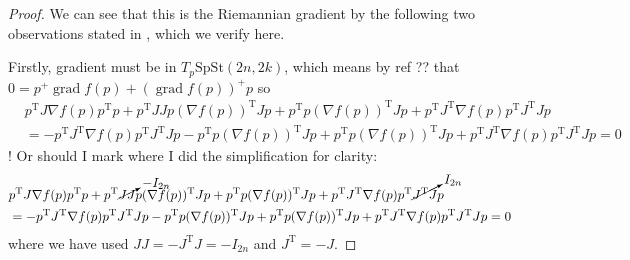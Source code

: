 \begin{proof}
    We can see that this is the Riemannian gradient by the following two observations stated in \cite{BZ}, which we verify here.

    Firstly, gradient must be in $T_{p}\mathrm{SpSt}(2n, 2k)$, which means by ref ?? that $0=p^{+}\operatorname{grad}f(p)+(\operatorname{grad}f(p))^{+}p$ so 
    \begin{align}
    &p^{\mathrm{T}}J\nabla f(p)p^{\mathrm{T}}p+p^{\mathrm{T}}JJp(\nabla f(p))^{\mathrm{T}}Jp+p^{\mathrm{T}}p(\nabla f(p))^{\mathrm{T}}Jp+p^{\mathrm{T}}J^{\mathrm{T}}\nabla f(p)p^{\mathrm{T}}J^{\mathrm{T}}Jp\\
    &= -p^{\mathrm{T}}J^{\mathrm{T}}\nabla f(p)p^{\mathrm{T}}J^{\mathrm{T}}Jp-p^{\mathrm{T}}p(\nabla f(p))^{\mathrm{T}}Jp+p^{\mathrm{T}}p(\nabla f(p))^{\mathrm{T}}Jp+p^{\mathrm{T}}J^{\mathrm{T}}\nabla f(p)p^{\mathrm{T}}J^{\mathrm{T}}Jp=0
    \end{align}
    ! Or should I mark where I did the simplification for clarity:
    \begin{align}
    &p^{\mathrm{T}}J\nabla f(p)p^{\mathrm{T}}p+p^{\mathrm{T}}\cancelto{-I_{2n}}{JJ}p(\nabla f(p))^{\mathrm{T}}Jp+p^{\mathrm{T}}p(\nabla f(p))^{\mathrm{T}}Jp+p^{\mathrm{T}}J^{\mathrm{T}}\nabla f(p)p^{\mathrm{T}}\cancelto{I_{2n}}{J^{\mathrm{T}}J}p\\
    &= -p^{\mathrm{T}}J^{\mathrm{T}}\nabla f(p)p^{\mathrm{T}}J^{\mathrm{T}}Jp-p^{\mathrm{T}}p(\nabla f(p))^{\mathrm{T}}Jp+p^{\mathrm{T}}p(\nabla f(p))^{\mathrm{T}}Jp+p^{\mathrm{T}}J^{\mathrm{T}}\nabla f(p)p^{\mathrm{T}}J^{\mathrm{T}}Jp=0
    \end{align}
    where we have used $JJ=-J^{\mathrm{T}}J=-I_{2n}$ and $J^{\mathrm{T}}=-J$.
    

\end{proof}
